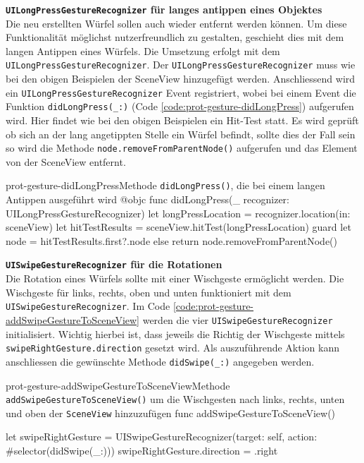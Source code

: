 \begin{description}
    \textbf{\texttt{UILongPressGestureRecognizer} für langes antippen eines Objektes}\\
    Die neu erstellten Würfel sollen auch wieder entfernt werden können. Um diese Funktionalität möglichst nutzerfreundlich zu gestalten, geschieht dies mit dem langen Antippen eines Würfels. Die Umsetzung erfolgt mit dem \texttt{UILongPressGestureRecognizer}. Der \texttt{UILongPressGestureRecognizer} muss wie bei den obigen Beispielen der SceneView hinzugefügt werden. Anschliessend wird ein \texttt{UILongPressGestureRecognizer} Event registriert, wobei bei einem Event die Funktion \texttt{didLongPress(\_:)} (Code \ref{code:prot-gesture-didLongPress}) aufgerufen wird. Hier findet wie bei den obigen Beispielen ein Hit-Test statt. Es wird geprüft ob sich an der lang angetippten Stelle ein Würfel befindt, sollte dies der Fall sein so wird die Methode \texttt{node.removeFromParentNode()} aufgerufen und das Element von der SceneView entfernt.

    \begin{code}{prot-gesture-didLongPress}{Methode \texttt{didLongPress()}, die bei einem langen Antippen ausgeführt wird}
    @objc
    func didLongPress(\_ recognizer: UILongPressGestureRecognizer) {
        let longPressLocation = recognizer.location(in: sceneView)
        let hitTestResults = sceneView.hitTest(longPressLocation)
        guard let node = hitTestResults.first?.node else { return }
        node.removeFromParentNode()
    }
    \end{code}
    
    \textbf{\texttt{UISwipeGestureRecognizer} für die Rotationen}\\
    Die Rotation eines Würfels sollte mit einer Wischgeste ermöglicht werden. Die Wischgeste für links, rechts, oben und unten funktioniert mit dem \texttt{UISwipeGestureRecognizer}. Im Code \ref{code:prot-gesture-addSwipeGestureToSceneView} werden die vier \texttt{UISwipeGestureRecognizer} initialisiert. Wichtig hierbei ist, dass jeweils die Richtig der Wischgeste mittels \texttt{swipeRightGesture.direction} gesetzt wird. Als auszuführende Aktion kann anschliessen die gewünschte Methode \texttt{didSwipe(\_:)} angegeben werden.

    \begin{code}{prot-gesture-addSwipeGestureToSceneView}{Methode \texttt{addSwipeGestureToSceneView()} um die Wischgesten nach links, rechts, unten und oben der \texttt{SceneView} hinzuzufügen}
        func addSwipeGestureToSceneView() {
            let swipeRightGesture = UISwipeGestureRecognizer(target: self, action: #selector(didSwipe(_:)))
            swipeRightGesture.direction = .right
            
}
\end{code}
\end{description}

